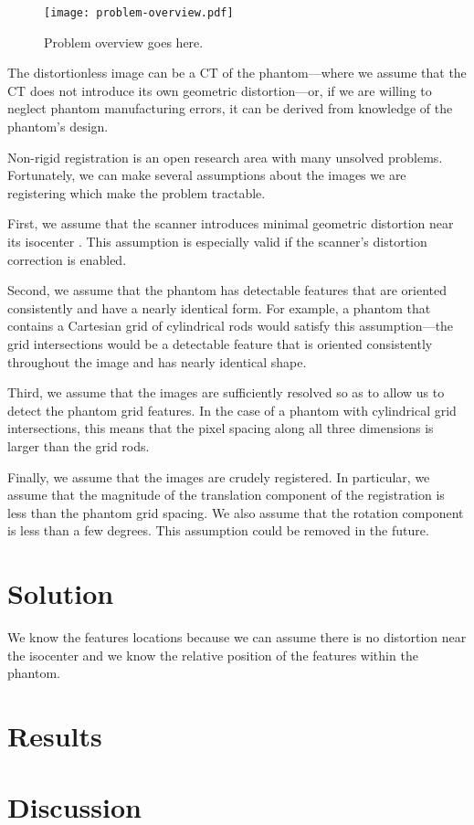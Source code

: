 \documentclass[12pt]{article}
\begin{document}
\begin{figure}[h]
    \centering
    \texttt{[image: problem-overview.pdf]}
    \caption{Problem overview goes here.}
    \label{fig:problem-overview}
\end{figure}

The distortionless image can be a CT of the phantom---where we assume that the CT does not introduce its own geometric distortion---or, if we are willing to neglect phantom manufacturing errors, it can be derived from knowledge of the phantom's design.

Non-rigid registration is an open research area with many unsolved problems.  Fortunately, we can make several assumptions about the images we are registering which make the problem tractable.

First, we assume that the scanner introduces minimal geometric distortion near its isocenter \cite{baldwin2007}.  This assumption is especially valid if the scanner's distortion correction is enabled.

Second, we assume that the phantom has detectable features that are oriented consistently and have a nearly identical form.  For example, a phantom that contains a Cartesian grid of cylindrical rods would satisfy this assumption---the grid intersections would be a detectable feature that is oriented consistently throughout the image and has nearly identical shape.

Third, we assume that the images are sufficiently resolved so as to allow us to detect the phantom grid features.  In the case of a phantom with cylindrical grid intersections, this means that the pixel spacing along all three dimensions is larger than the grid rods.

Finally, we assume that the images are crudely registered.  In particular, we assume that the magnitude of the translation component of the registration is less than the phantom grid spacing.  We also assume that the rotation component is less than a few degrees.  This assumption could be removed in the future.

\section*{Solution}
  We know the features locations because we can assume there is no distortion near the isocenter and we know the relative position of the features within the phantom.

\section*{Results}

\section*{Discussion}



\end{document}
